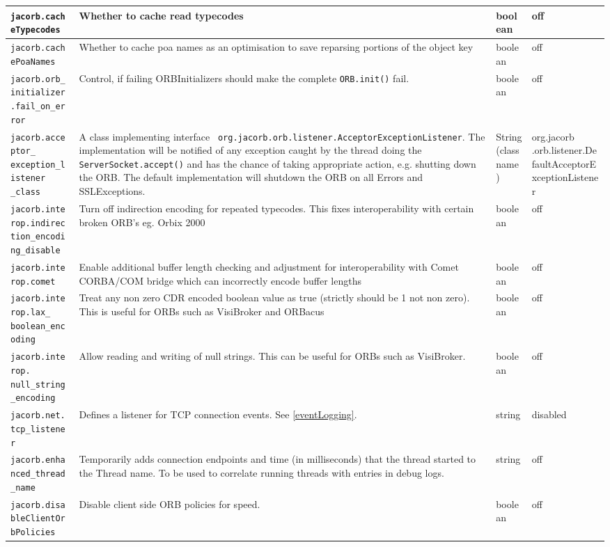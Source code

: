 \begin{small}
\begin{longtable}{|p{5cm}|p{7.5cm}|p{1.5cm}|p{1.5cm}|}
\hline
\verb"jacorb.cacheTypecodes" & Whether to cache read
typecodes  & boolean & off \\
\hline
\verb"jacorb.cachePoaNames" & Whether to cache poa names as an optimisation
to save reparsing portions of the object key& boolean & off \\
\hline
\verb"jacorb.orb_initializer"
\verb".fail_on_error" & Control, if failing ORBInitializers should make the
complete {\tt ORB.init()} fail. & boolean & off \\
\hline
\verb"jacorb.acceptor_"
\verb"exception_listener"
\verb"_class" & A class implementing interface {\tt
  org.jacorb.orb.listener.AcceptorException\-Listener}. The implementation
will be notified of any exception caught by the thread doing the {\tt
  ServerSocket.accept()} and has the chance of taking appropriate action,
e.g. shutting down the ORB. The default implementation will shutdown the ORB
on all Errors and SSLExceptions. & String (classname) & org.jacorb
.orb.listener.DefaultAcceptorExceptionListener \\
\hline
\verb"jacorb.interop.indirec"
\verb"tion_encoding_disable" & Turn off indirection encoding for
repeated typecodes. This fixes interoperability with certain broken
ORB's eg. Orbix 2000 & boolean & off \\
\hline
\verb"jacorb.interop.comet" & Enable additional buffer length checking
and adjustment for interoperability with Comet CORBA/COM bridge which
can incorrectly encode buffer lengths & boolean & off \\
\hline
\verb"jacorb.interop.lax_"
\verb"boolean_encoding" & Treat any non zero CDR encoded boolean value
as true (strictly should be 1 not non zero). This is useful for ORBs such
as VisiBroker and ORBacus & boolean & off \\
\hline
\verb"jacorb.interop."
\verb"null_string_encoding" & Allow reading and writing of null strings.
This can be useful for ORBs such as VisiBroker. & boolean & off \\
\hline
\verb"jacorb.net.tcp_listene"
\verb"r" & Defines a listener for TCP connection events. See \ref{eventLogging}.
& string & disabled\\
\hline
\verb"jacorb.enhanced_thread"
\verb"_name" & Temporarily adds connection endpoints and time (in milliseconds)
that the thread started to the Thread name. To be used to correlate running
threads with entries in debug logs. & string & off\\
\hline
\verb"jacorb.disableClientOr"
\verb"bPolicies" &
Disable client side ORB policies for speed. & boolean & off\\

\end{longtable}
\end{small}
